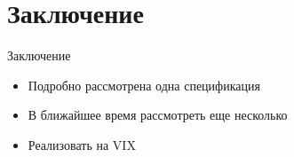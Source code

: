 \documentclass[11pt]{beamer} %
\begin{document}
\section{Заключение}
    \begin{frame}{Заключение}
        \begin{itemize}
            \item Подробно рассмотрена одна спецификация
            \item В ближайшее время рассмотреть еще несколько
            \item Реализовать на VIX
        \end{itemize}
    \end{frame}


\end{document}
